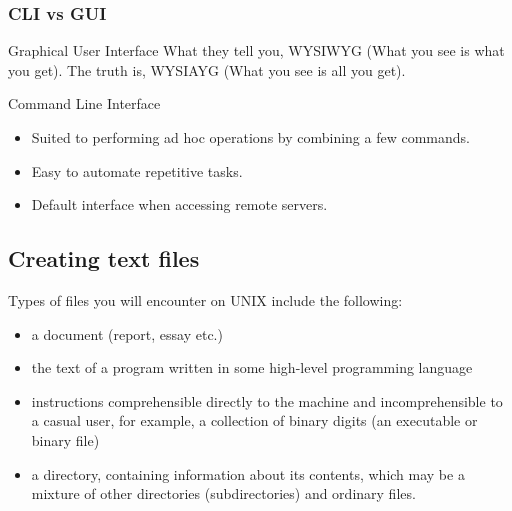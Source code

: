 \documentclass[a4paper]{beamer}
\newcommand{\ftitle}[1]{\frametitle<presentation>{#1}}
\begin{document}



\begin{frame}
\ftitle{CLI vs GUI}
\begin{block}{Graphical User Interface}
What they tell you, WYSIWYG (What you see is what you get). \pause
The truth is, WYSIAYG (What you see is all you get).
\end{block}

\pause

\begin{block}{Command Line Interface}
\begin{itemize}
\item Suited to performing ad hoc operations by combining a few commands.  
\item Easy to automate repetitive tasks.
\item Default interface when accessing remote servers.  
\end{itemize}
\end{block}
\end{frame}


\subsection{Creating text files}
Types of files you will encounter on UNIX include the following:
\begin{itemize}
\item a document (report, essay etc.)
\item the text of a program written in some high-level programming language
\item instructions comprehensible directly to the machine and incomprehensible 
to a casual user, for example, a collection of binary digits (an executable or 
binary file)
\item a directory, containing information about its contents, which may be a 
mixture of other directories (subdirectories) and ordinary files.
\end{itemize}
\end{document}
